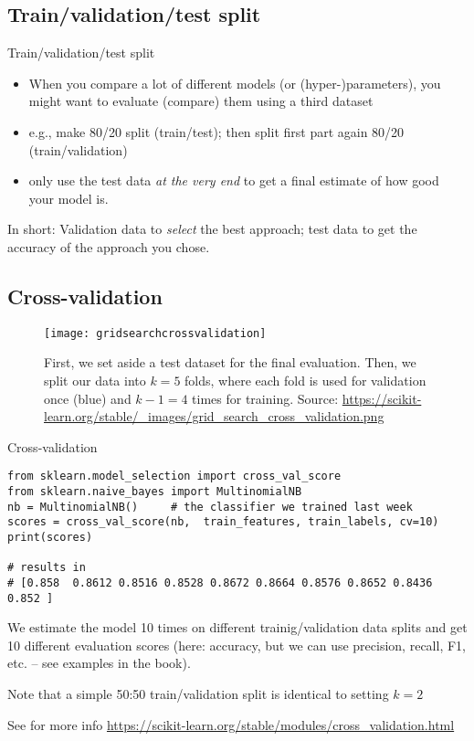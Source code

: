 \subsection{Train/validation/test split}

\begin{frame}{Train/validation/test split}
\begin{itemize}
	\item When you compare a lot of different models (or (hyper-)parameters), you might want to evaluate (compare) them using a third dataset 
	\item e.g., make 80/20 split (train/test); then split first part again 80/20 (train/validation)
	\item only use the test data \emph{at the very end} to get a final estimate of how good your model is.
\end{itemize}
\pause
In short: Validation data to \emph{select} the best approach; test data to get the accuracy of the approach you chose.
\end{frame}

\subsection{Cross-validation}



\begin{frame}[plain]
	
	\begin{figure}
		\centering
		\texttt{[image: gridsearchcrossvalidation]}
		\caption{First, we set aside a test dataset for the final evaluation. Then, we split our data into $k=5$ folds, where each fold is used for validation once (blue) and $k-1=4$ times for training.
			\tiny Source: \url{https://scikit-learn.org/stable/_images/grid_search_cross_validation.png}}
		\label{fig:crossval}
	\end{figure}
\end{frame}



\begin{frame}[fragile]{Cross-validation}
\begin{verbatim}
from sklearn.model_selection import cross_val_score
from sklearn.naive_bayes import MultinomialNB
nb = MultinomialNB()     # the classifier we trained last week
scores = cross_val_score(nb,  train_features, train_labels, cv=10)
print(scores)

# results in
# [0.858  0.8612 0.8516 0.8528 0.8672 0.8664 0.8576 0.8652 0.8436 0.852 ]
\end{verbatim}

We estimate the model 10 times on different trainig/validation data splits and get 10 different evaluation scores (here: accuracy, but we can use precision, recall, F1, etc. -- see examples in the book).

Note that a simple 50:50 train/validation split is identical to setting $k=2$ 

{\tiny See for more info
	\url{https://scikit-learn.org/stable/modules/cross\_validation.html}}
\end{frame}



